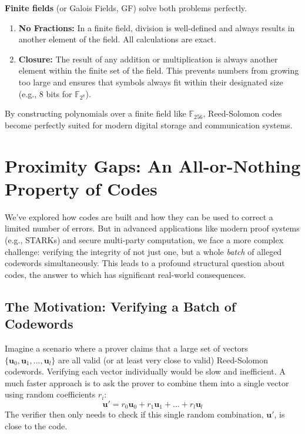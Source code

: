 \documentclass{article}
\begin{document}
\textbf{Finite fields} (or Galois Fields, GF) solve both problems perfectly.
\begin{enumerate}
    \item \textbf{No Fractions:} In a finite field, division is well-defined and always results in another element of the field. All calculations are exact.
    \item \textbf{Closure:} The result of any addition or multiplication is always another element within the finite set of the field. This prevents numbers from growing too large and ensures that symbols always fit within their designated size (e.g., 8 bits for $\mathbb{F}_{2^8}$).
\end{enumerate}
By constructing polynomials over a finite field like $\mathbb{F}_{256}$, Reed-Solomon codes become perfectly suited for modern digital storage and communication systems.




\section{Proximity Gaps: An All-or-Nothing Property of Codes}

We've explored how codes are built and how they can be used to correct a limited number of errors. But in advanced applications like modern proof systems (e.g., STARKs) and secure multi-party computation, we face a more complex challenge: verifying the integrity of not just one, but a whole \textit{batch} of alleged codewords simultaneously. This leads to a profound structural question about codes, the answer to which has significant real-world consequences.

\subsection{The Motivation: Verifying a Batch of Codewords}
Imagine a scenario where a prover claims that a large set of vectors $\{ \mathbf{u}_0, \mathbf{u}_1, \dots, \mathbf{u}_l \}$ are all valid (or at least very close to valid) Reed-Solomon codewords. Verifying each vector individually would be slow and inefficient. A much faster approach is to ask the prover to combine them into a single vector using random coefficients $r_i$:
\[ \mathbf{u}' = r_0\mathbf{u}_0 + r_1\mathbf{u}_1 + \dots + r_l\mathbf{u}_l \]
The verifier then only needs to check if this single random combination, $\mathbf{u}'$, is close to the code.
\end{document}
